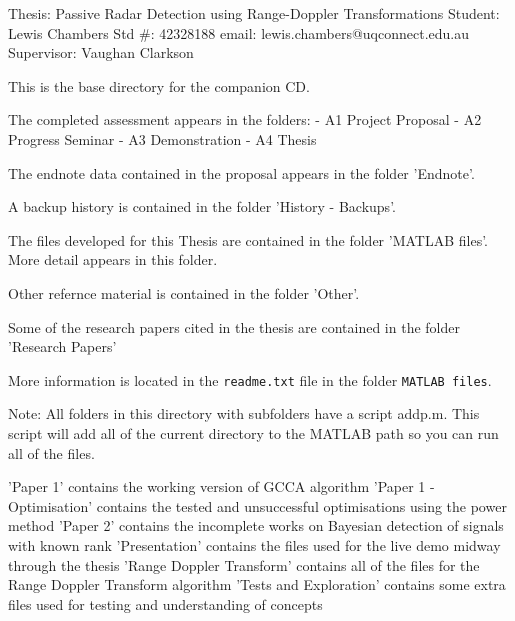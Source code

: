 \documentclass[12pt,openany,a4paper]{book}
\begin{document}
\begin{spverbatim}
Thesis: Passive Radar Detection using Range-Doppler Transformations
Student: Lewis Chambers
Std #: 42328188
email: lewis.chambers@uqconnect.edu.au
Supervisor: Vaughan Clarkson

This is the base directory for the companion CD.

The completed assessment appears in the folders:
 - A1 Project Proposal
 - A2 Progress Seminar
 - A3 Demonstration
 - A4 Thesis

The endnote data contained in the proposal appears in the folder 'Endnote'.

A backup history is contained in the folder 'History - Backups'.

The files developed for this Thesis are contained in the folder 'MATLAB files'. More detail appears in this folder.

Other refernce material is contained in the folder 'Other'.

Some of the research papers cited in the thesis are contained in the folder 'Research Papers'
\end{spverbatim}
\bigskip
More information is located in the \verb+readme.txt+ file in the folder \verb+MATLAB files+.
\begin{spverbatim}
Note: All folders in this directory with subfolders have a script addp.m. This script will add all of the current directory to the MATLAB path so you can run all of the files.

'Paper 1' contains the working version of GCCA algorithm
'Paper 1 - Optimisation' contains the tested and unsuccessful optimisations using the power method
'Paper 2' contains the incomplete works on Bayesian detection of signals with known rank
'Presentation' contains the files used for the live demo midway through the thesis
'Range Doppler Transform' contains all of the files for the Range Doppler Transform algorithm
'Tests and Exploration' contains some extra files used for testing and understanding of concepts
\end{spverbatim}

\cleardoublepage
\end{document}
